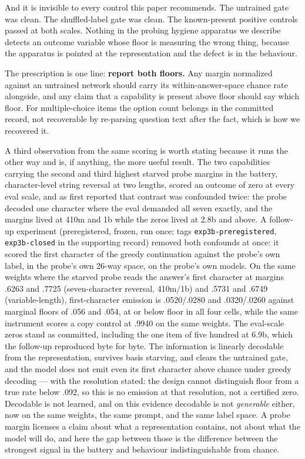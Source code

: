 And it is invisible to every control this paper recommends. The
untrained gate was clean. The shuffled-label gate was clean. The
known-present positive controls passed at both scales. Nothing in the
probing hygiene apparatus we describe detects an outcome variable
whose floor is measuring the wrong thing, because the apparatus is
pointed at the representation and the defect is in the behaviour.

The prescription is one line: \textbf{report both floors.} Any margin
normalized against an untrained network should carry its
within-answer-space chance rate alongside, and any claim that a
capability is present above floor should say which floor. For
multiple-choice items the option count belongs in the committed
record, not recoverable by re-parsing question text after the fact,
which is how we recovered it.

A third observation from the same scoring is worth stating because it
runs the other way and is, if anything, the more useful result. The
two capabilities carrying the second and third highest starved probe
margins in the battery, character-level string reversal at two
lengths, scored an outcome of zero at every eval scale, and as first
reported that contrast was confounded twice: the probe decoded one
character where the eval demanded all seven exactly, and the margins
lived at 410m and 1b while the zeros lived at 2.8b and above. A
follow-up experiment (preregistered, frozen, run once; tags
\texttt{exp3b-preregistered}, \texttt{exp3b-closed} in the supporting record)
removed both confounds at once: it scored the first character of the
greedy continuation against the probe's own label, in the probe's own 26-way space, on the probe's own models. On the
same weights where the starved probe reads the answer's
first character at margins .6263 and .7725 (seven-character reversal,
410m/1b) and .5731 and .6749 (variable-length), first-character
emission is .0520/.0280 and .0320/.0260 against marginal floors of
.056 and .054, at or below floor in all four cells, while the same
instrument scores a copy control at .9940 on the same weights. The
eval-scale zeros stand as committed, including the one item of five
hundred at 6.9b, which the follow-up reproduced byte for byte. The
information is linearly decodable from the representation, survives
basis starving, and clears the untrained gate, and the model does not
emit even its first character above chance under greedy decoding ---
with the resolution stated: the design cannot distinguish floor from a
true rate below .092, so this is no emission at that resolution, not a
certified zero. Decodable is not learned, and on this evidence
decodable is not \emph{generable} either, now on the same weights, the same
prompt, and the same label space. A probe margin licenses a claim
about what a representation contains, not about what the model will
do, and here the gap between those is the difference between the
strongest signal in the battery and behaviour indistinguishable from
chance.


